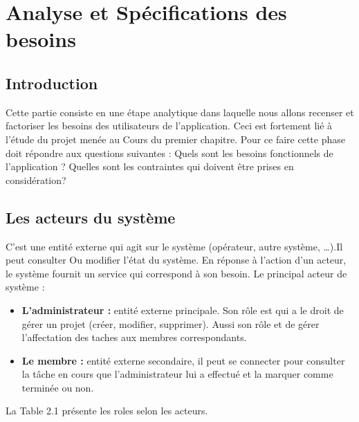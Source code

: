 \chapter{ Analyse et Sp\'{e}cifications des besoins }
\section{Introduction}


Cette partie consiste en une \'{e}tape analytique dans laquelle nous allons
recenser et factoriser les besoins des utilisateurs de l'application. Ceci est
fortement li\'{e} \`{a} l'\'{e}tude du projet men\'{e}e au
Cours du premier chapitre.
Pour ce faire cette phase doit r\'{e}pondre aux questions suivantes :
Quels sont les besoins fonctionnels de l'application ?
Quelles sont les contraintes qui doivent \^{e}tre prises en consid\'{e}ration?

   \section{ Les acteurs du syst\`{e}me }
C'est une entit\'{e} externe qui agit sur le syst\`{e}me (op\'{e}rateur, autre syst\`{e}me,
\ldots{}).Il peut consulter
Ou modifier l'\'{e}tat du syst\`{e}me.
En r\'{e}ponse \`{a} l'action d'un acteur, le syst\`{e}me fournit un service qui
correspond \`{a} son besoin.
Le principal acteur de syst\`{e}me :
\begin{itemize}
\item{  \textbf{L'administrateur :} entit\'{e} externe principale. Son r\^{o}le est qui a le droit de
g\'{e}rer un projet (cr\'{e}er, modifier, supprimer).
Aussi son r\^{o}le et de g\'{e}rer l'affectation des taches aux membres
correspondants.
}

\item{ \textbf{Le membre : } entit\'{e} externe secondaire, il peut se connecter pour consulter la
t\^{a}che en cours que l'administrateur lui a effectu\'{e} et la marquer comme
termin\'{e}e ou non.
}
\end{itemize}

La Table 2.1 pr\'{e}sente les roles selon les acteurs.

